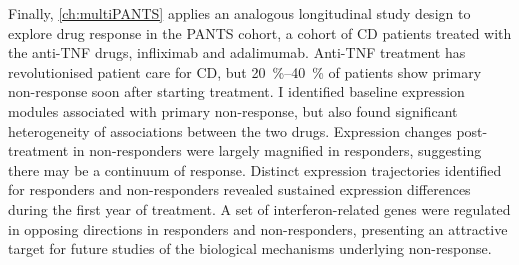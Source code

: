 Finally, \cref{ch:multiPANTS} applies an analogous longitudinal study design to explore drug response in the \gls{PANTS} cohort,
a cohort of \gls{CD} patients treated with the anti-\gls{TNF} drugs, infliximab and adalimumab.
Anti-\gls{TNF} treatment has revolutionised patient care for \gls{CD},
but \SIrange{20}{40}{\percent} of patients show primary non-response soon after starting treatment.
I identified baseline expression modules associated with primary non-response, but also found significant heterogeneity of associations between the two drugs.
Expression changes post-treatment in non-responders were largely magnified in responders, suggesting there may be a continuum of response.
Distinct expression trajectories identified for responders and non-responders revealed sustained expression differences during the first year of treatment.
A set of interferon-related genes were regulated in opposing directions in responders and non-responders,
presenting an attractive target for future studies of the biological mechanisms underlying non-response.
%

